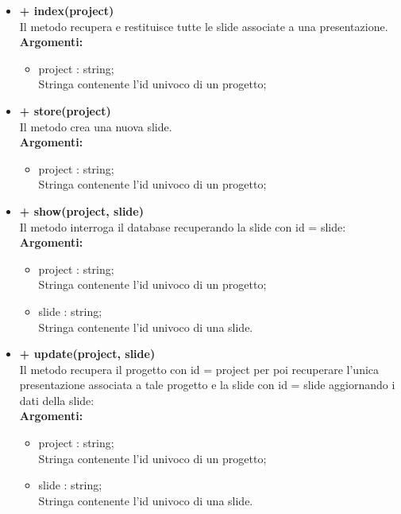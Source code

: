 		\begin{itemize}
			\item \textbf{+ index(project)}\\
				Il metodo recupera e restituisce tutte le slide associate a una presentazione.\\
				\textbf{Argomenti:}
				\begin{itemize}
					\item project : string; \\
					Stringa contenente l'id univoco di un progetto;
				\end{itemize}
			\item \textbf{+ store(project)}\\
				Il metodo crea una nuova slide.\\
				\textbf{Argomenti:}
				\begin{itemize}
					\item project : string; \\
					Stringa contenente l'id univoco di un progetto;
				\end{itemize}
			\item \textbf{+ show(project, slide)}\\
				Il metodo interroga il database recuperando la slide con id = slide:\\
				\textbf{Argomenti:}
					\begin{itemize}
						\item project : string; \\
						Stringa contenente l'id univoco di un progetto;
						\item slide : string;\\
						Stringa contenente l'id univoco di una slide.
					\end{itemize}
			\item \textbf{+ update(project, slide)}\\
				Il metodo recupera il progetto con id = project per poi recuperare l'unica presentazione associata a tale progetto e la slide con id = slide aggiornando i dati della slide:\\
					\textbf{Argomenti:}
					\begin{itemize}
						\item project : string; \\
						Stringa contenente l'id univoco di un progetto;
						\item slide : string;\\
						Stringa contenente l'id univoco di una slide.
					\end{itemize}

\end{itemize}
